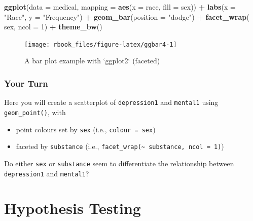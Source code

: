 \documentclass[]{book}
\newenvironment{Shaded}{\begin{snugshade}}{\end{snugshade}}
\newcommand{\DataTypeTok}[1]{\textcolor[rgb]{0.13,0.29,0.53}{#1}}
\newcommand{\DecValTok}[1]{\textcolor[rgb]{0.00,0.00,0.81}{#1}}
\newcommand{\KeywordTok}[1]{\textcolor[rgb]{0.13,0.29,0.53}{\textbf{#1}}}
\newcommand{\NormalTok}[1]{#1}
\newcommand{\OperatorTok}[1]{\textcolor[rgb]{0.81,0.36,0.00}{\textbf{#1}}}
\newcommand{\StringTok}[1]{\textcolor[rgb]{0.31,0.60,0.02}{#1}}
\providecommand{\tightlist}{%
  \setlength{\itemsep}{0pt}\setlength{\parskip}{0pt}}
\begin{document}
\begin{Shaded}
\begin{Highlighting}[]
\KeywordTok{ggplot}\NormalTok{(}\DataTypeTok{data =}\NormalTok{ medical, }
       \DataTypeTok{mapping =} \KeywordTok{aes}\NormalTok{(}\DataTypeTok{x =}\NormalTok{ race, }\DataTypeTok{fill =}\NormalTok{ sex)) }\OperatorTok{+}\StringTok{ }
\StringTok{  }\KeywordTok{labs}\NormalTok{(}\DataTypeTok{x =} \StringTok{"Race"}\NormalTok{,}
       \DataTypeTok{y =} \StringTok{"Frequency"}\NormalTok{) }\OperatorTok{+}\StringTok{ }
\StringTok{  }\KeywordTok{geom_bar}\NormalTok{(}\DataTypeTok{position =} \StringTok{"dodge"}\NormalTok{) }\OperatorTok{+}
\StringTok{  }\KeywordTok{facet_wrap}\NormalTok{(}\OperatorTok{~}\StringTok{ }\NormalTok{sex, }\DataTypeTok{ncol =} \DecValTok{1}\NormalTok{) }\OperatorTok{+}
\StringTok{  }\KeywordTok{theme_bw}\NormalTok{()}
\end{Highlighting}
\end{Shaded}

\begin{figure}

{\centering \texttt{[image: rbook\_files/figure-latex/ggbar4-1]} 

}

\caption{A bar plot example with `ggplot2` (faceted)}\label{fig:ggbar4}
\end{figure}

\hypertarget{your-turn-7}{%
\subsection{Your Turn}\label{your-turn-7}}

Here you will create a scatterplot of \texttt{depression1} and \texttt{mental1} using \texttt{geom\_point()}, with

\begin{itemize}
\tightlist
\item
  point colours set by \texttt{sex} (i.e., \texttt{colour\ =\ sex})
\item
  faceted by \texttt{substance} (i.e., \texttt{facet\_wrap(\textasciitilde{}\ substance,\ ncol\ =\ 1)})
\end{itemize}

Do either \texttt{sex} or \texttt{substance} seem to differentiate the relationship between \texttt{depression1} and \texttt{mental1}?

\hypertarget{part5}{%
\chapter{Hypothesis Testing}\label{part5}}
\end{document}
